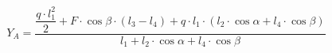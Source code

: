 \documentclass[preview]{standalone}
\begin{document}
\begin{align*}
Y_A  = \dfrac{\dfrac{q\cdot l_1^2}{2} + F\cdot \cos{\beta} \cdot (l_3 - l_4) + q\cdot l_1\cdot (l_2\cdot \cos{\alpha} + l_4\cdot\cos{\beta})}{l_1 + l_2\cdot \cos{\alpha} + l_4\cdot \cos{\beta}}
\end{align*}
\end{document}
